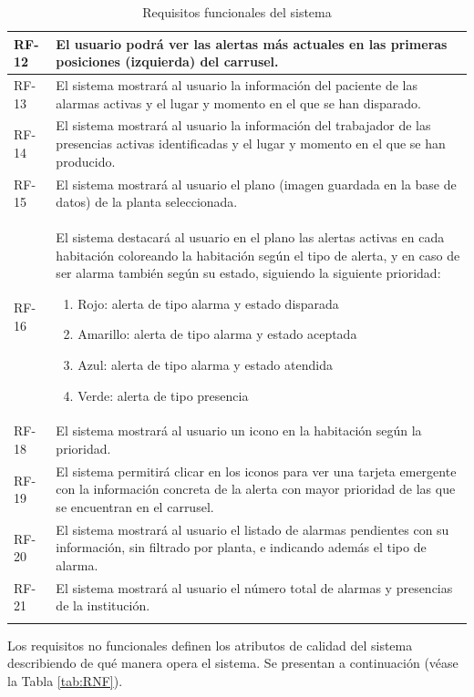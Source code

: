 \begin{longtable}{|p{1cm}|p{14cm}|}
	\hline
	RF-12	&	El usuario podrá ver las alertas más actuales en las primeras posiciones (izquierda) del carrusel. \\
	\hline
	RF-13	&	El sistema mostrará al usuario la información del paciente de las alarmas activas y el lugar y momento en el que se han disparado. \\
	\hline
	RF-14	&	El sistema mostrará al usuario la información del trabajador de las presencias activas identificadas y el lugar y momento en el que se han producido. \\
	\hline
	RF-15	&	El sistema mostrará al usuario el plano (imagen guardada en la base de datos) de la planta seleccionada.  \\
	\hline
	RF-16	&	El sistema destacará al usuario en el plano las alertas activas en cada habitación coloreando la habitación según el tipo de alerta, y en caso de ser alarma también según su estado, siguiendo la siguiente prioridad:
	\begin{enumerate}
		\item Rojo: alerta de tipo alarma y estado disparada
		\item Amarillo: alerta de tipo alarma y estado aceptada
		\item Azul: alerta de tipo alarma y estado atendida
		\item Verde: alerta de tipo presencia
	\end{enumerate}\\
	\hline
	RF-18	&	El sistema mostrará al usuario un icono en la habitación según la prioridad. \\
	\hline
	RF-19	&	El sistema permitirá clicar en los iconos para ver una tarjeta emergente con la información concreta de la alerta con mayor prioridad de las que se encuentran en el carrusel. \\
	\hline
	RF-20	&	El sistema mostrará al usuario el listado de alarmas pendientes con su información, sin filtrado por planta, e indicando además el tipo de alarma. \\
	\hline
	RF-21	&	El sistema mostrará al usuario el número total de alarmas y presencias de la institución. \\
	\hline
\caption{Requisitos funcionales del sistema}
\label{tab:RF}
\end{longtable}

Los requisitos no funcionales definen los atributos de calidad del sistema describiendo de qué manera opera el sistema. Se presentan a continuación (véase la Tabla \ref{tab:RNF}).

